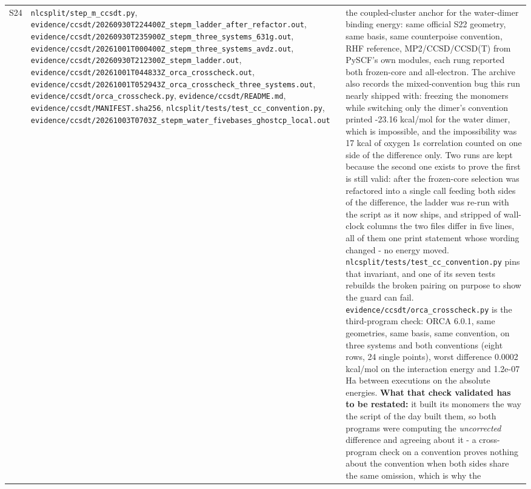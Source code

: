 \documentclass[11pt]{article}
\begin{document}
\begin{longtable}{c>{\raggedright\arraybackslash}p{}>{\raggedright\arraybackslash}p{}}
S24 & \texttt{nlcsplit/step\_m\_ccsdt.py}, \texttt{evidence/\allowbreak{}ccsdt/\allowbreak{}20260930T224400Z\_\allowbreak{}stepm\_\allowbreak{}ladder\_\allowbreak{}after\_\allowbreak{}refactor.out}, \texttt{evidence/\allowbreak{}ccsdt/\allowbreak{}20260930T235900Z\_\allowbreak{}stepm\_\allowbreak{}three\_\allowbreak{}systems\_\allowbreak{}631g.out}, \texttt{evidence/\allowbreak{}ccsdt/\allowbreak{}20261001T000400Z\_\allowbreak{}stepm\_\allowbreak{}three\_\allowbreak{}systems\_\allowbreak{}avdz.out}, \texttt{evidence/\allowbreak{}ccsdt/\allowbreak{}20260930T212300Z\_\allowbreak{}stepm\_\allowbreak{}ladder.out}, \texttt{evidence/\allowbreak{}ccsdt/\allowbreak{}20261001T044833Z\_\allowbreak{}orca\_\allowbreak{}crosscheck.out}, \texttt{evidence/\allowbreak{}ccsdt/\allowbreak{}20261001T052943Z\_\allowbreak{}orca\_\allowbreak{}crosscheck\_\allowbreak{}three\_\allowbreak{}systems.out}, \texttt{evidence/\allowbreak{}ccsdt/\allowbreak{}orca\_\allowbreak{}crosscheck.py}, \texttt{evidence/ccsdt/README.md}, \texttt{evidence/\allowbreak{}ccsdt/\allowbreak{}MANIFEST.sha256}, \texttt{nlcsplit/\allowbreak{}tests/\allowbreak{}test\_\allowbreak{}cc\_\allowbreak{}convention.py}, \texttt{evidence/\allowbreak{}ccsdt/\allowbreak{}20261003T0703Z\_\allowbreak{}stepm\_\allowbreak{}water\_\allowbreak{}fivebases\_\allowbreak{}ghostcp\_\allowbreak{}local.out} & the coupled-cluster anchor for the water-dimer binding energy: same official S22 geometry, same basis, same counterpoise convention, RHF reference, MP2/CCSD/CCSD(T) from PySCF's own modules, each rung reported both frozen-core and all-electron. The archive also records the mixed-convention bug this run nearly shipped with: freezing the monomers while switching only the dimer's convention printed -23.16 kcal/mol for the water dimer, which is impossible, and the impossibility was 17 kcal of oxygen 1s correlation counted on one side of the difference only. Two runs are kept because the second one exists to prove the first is still valid: after the frozen-core selection was refactored into a single call feeding both sides of the difference, the ladder was re-run with the script as it now ships, and stripped of wall-clock columns the two files differ in five lines, all of them one print statement whose wording changed - no energy moved. \texttt{nlcsplit/\allowbreak{}tests/\allowbreak{}test\_\allowbreak{}cc\_\allowbreak{}convention.py} pins that invariant, and one of its seven tests rebuilds the broken pairing on purpose to show the guard can fail. \texttt{evidence/\allowbreak{}ccsdt/\allowbreak{}orca\_\allowbreak{}crosscheck.py} is the third-program check: ORCA 6.0.1, same geometries, same basis, same convention, on three systems and both conventions (eight rows, 24 single points), worst difference 0.0002 kcal/mol on the interaction energy and 1.2e-07 Ha between executions on the absolute energies. \textbf{What that check validated has to be restated:} it built its monomers the way the script of the day built them, so both programs were computing the \emph{uncorrected} difference and agreeing about it - a cross-program check on a convention proves nothing about the convention when both sides share the same omission, which is why the 
\end{longtable}
\end{document}
